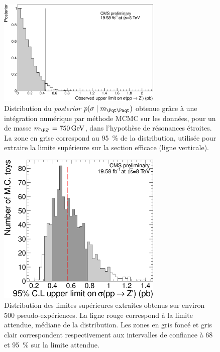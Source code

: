 \begin{figure}[tbp]
  \centering
  \includegraphics[width=0.7\textwidth]{chapitre7/figs/posterior_plot_750.pdf}
  \caption{Distribution du \emph{posterior} $p(\sigma \mid \mtt)$ obtenue grâce à une intégration numérique par méthode MCMC sur les données, pour un \zprime de masse $\mzp = \SI{750}{\GeV}$, dans l'hypothèse de résonances étroites. La zone en grise correspond au \SI{95}{\percent} de la distribution, utilisée pour extraire la limite supérieure sur la section efficace (ligne verticale).}
  \label{fig:posterior}
\end{figure}

\begin{figure}[tbp]
  \centering
  \includegraphics[width=0.7\textwidth]{chapitre7/figs/posterior_plot_expected_750.pdf}
  \caption{Distribution des limites supérieures extraites obtenus sur environ 500 pseudo-expériences. La ligne rouge correspond à la limite attendue, médiane de la distribution. Les zones en gris foncé et gris clair correspondent respectivement aux intervalles de confiance à 68 et \SI{95}{\%} sur la limite attendue.}
  \label{fig:posterior_mc}
\end{figure}


